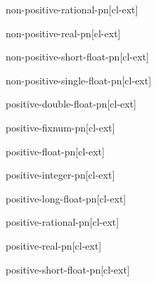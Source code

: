 \documentclass[10pt,english]{book}
\begin{document}
\begin{function}{non-positive-rational-p}{n}[cl-ext]
  
\end{function}

\begin{function}{non-positive-real-p}{n}[cl-ext]
  
\end{function}

\begin{function}{non-positive-short-float-p}{n}[cl-ext]
  
\end{function}

\begin{function}{non-positive-single-float-p}{n}[cl-ext]
  
\end{function}

\begin{function}{positive-double-float-p}{n}[cl-ext]
  
\end{function}

\begin{function}{positive-fixnum-p}{n}[cl-ext]
  
\end{function}

\begin{function}{positive-float-p}{n}[cl-ext]
  
\end{function}

\begin{function}{positive-integer-p}{n}[cl-ext]
  
\end{function}

\begin{function}{positive-long-float-p}{n}[cl-ext]
  
\end{function}

\begin{function}{positive-rational-p}{n}[cl-ext]
  
\end{function}

\begin{function}{positive-real-p}{n}[cl-ext]
  
\end{function}

\begin{function}{positive-short-float-p}{n}[cl-ext]
  
\end{function}
\end{document}
